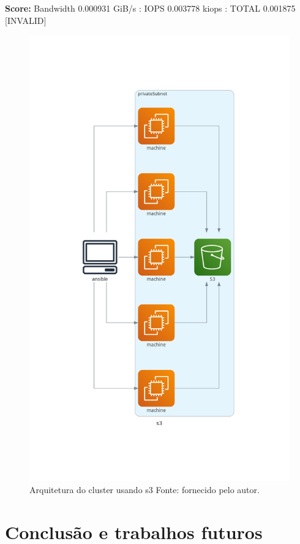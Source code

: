 \documentclass[article,a4paper,12pt,brazil,sumario=tradicional]{abntex2}
\begin{document}
\textbf{Score:} Bandwidth 0.000931 GiB/s : IOPS 0.003778 kiops : TOTAL 0.001875 [INVALID]
\begin{figure}[htb]
	\centering
	\includegraphics[width=1\textwidth]{s3.png}
	\caption{Arquitetura do cluster usando s3 Fonte: fornecido pelo autor.}
	\label{fig:s3}
\end{figure}

\section{Conclusão e trabalhos futuros}
\end{document}
